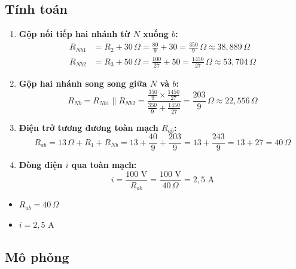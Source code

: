 \subsection{Tính toán}
\begin{enumerate}[leftmargin=2em]
  \item \textbf{Gộp nối tiếp hai nhánh từ $N$ xuống $b$:}
        \begin{align*}
        R_{Nb1} &= R_2 + 30\,\Omega = \frac{80}{9} + 30 = \frac{350}{9}\,\Omega \approx 38{,}889\,\Omega \\
        R_{Nb2} &= R_3 + 50\,\Omega = \frac{100}{27} + 50 = \frac{1450}{27}\,\Omega \approx 53{,}704\,\Omega
        \end{align*}
  \item \textbf{Gộp hai nhánh song song giữa $N$ và $b$:}
        \[
        R_{Nb} = R_{Nb1} \parallel R_{Nb2} = \frac{\frac{350}{9} \times \frac{1450}{27}}{\frac{350}{9} + \frac{1450}{27}} = \frac{203}{9}\,\Omega \approx 22{,}556\,\Omega
        \]
  \item \textbf{Điện trở tương đương toàn mạch $R_{ab}$:}
        \[
        R_{ab} = 13\,\Omega + R_1 + R_{Nb} = 13 + \frac{40}{9} + \frac{203}{9} = 13 + \frac{243}{9} = 13 + 27 = 40\,\Omega
        \]
  \item \textbf{Dòng điện $i$ qua toàn mạch:}
        \[
        i = \frac{100\text{ V}}{R_{ab}} = \frac{100\text{ V}}{40\,\Omega} = 2{,}5\text{ A}
        \]
\end{enumerate}

\begin{dapsobox}
  \begin{itemize}[leftmargin=1.5em]
    \item $R_{ab} = 40\,\Omega$
    \item $i = 2{,}5\text{ A}$
  \end{itemize}
\end{dapsobox}

\subsection{Mô phỏng}
\simresult
{}
